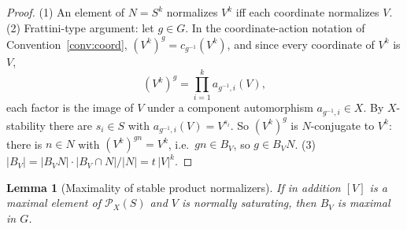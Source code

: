 \documentclass[11pt]{amsart}
\newtheorem{lemma}[theorem]{Lemma}
\theoremstyle{definition}
\theoremstyle{remark}
\newcommand{\Pos}{\mathcal{P}}
\begin{document}
\begin{proof}
(1) An element of $N=S^k$ normalizes $V^k$ iff each coordinate normalizes
$V$. (2) Frattini-type argument: let $g\in G$. In the coordinate-action
notation of Convention~\ref{conv:coord}, $(V^k)^g=c_{g^{-1}}(V^k)$, and
since every coordinate of $V^k$ is $V$,
\[
(V^k)^g=\prod_{i=1}^{k} a_{g^{-1},i}(V),
\]
each factor is the image of $V$ under a component automorphism
$a_{g^{-1},i}\in X$. By $X$-stability there are $s_i\in S$ with
$a_{g^{-1},i}(V)=V^{s_i}$. So $(V^k)^g$ is $N$-conjugate to
$V^k$: there is $n\in N$ with $(V^k)^{gn}=V^k$, i.e.\ $gn\in B_V$, so
$g\in B_VN$. (3) $|B_V|=|B_VN|\cdot|B_V\cap N|/|N|=t\,|V|^k$.
\end{proof}

\begin{lemma}[Maximality of stable product normalizers]\label{lem:B}
If in addition $[V]$ is a maximal element of $\Pos_X(S)$ and $V$ is
normally saturating, then $B_V$ is maximal in $G$.
\end{lemma}
\end{document}
